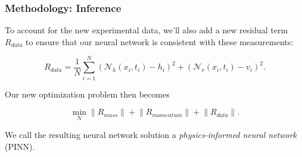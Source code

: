 \begin{frame}
    \frametitle{Methodology: Inference}

    To account for the new experimental data, we'll also add a new residual term $R_{data}$ to ensure that our neural
    network is consistent with these measurements:

    $$
    R_{data} = \frac{1}{N} \sum\limits_{i=1}^N \left( \mathcal{N}_h (x_i, t_i) - h_i \right)^2 
                                             + \left( \mathcal{N}_v (x_i, t_i) - v_i \right)^2.
    $$

    \bigskip
    \pause
    Our new optimization problem then becomes

    $$
    \min_{\mathcal{N}} {\lVert R_{mass} \rVert + \lVert R_{momentum} \rVert + \lVert R_{data} \rVert}.
    $$

    We call the resulting neural network solution a \textit{physics-informed neural network} (PINN).
\end{frame}